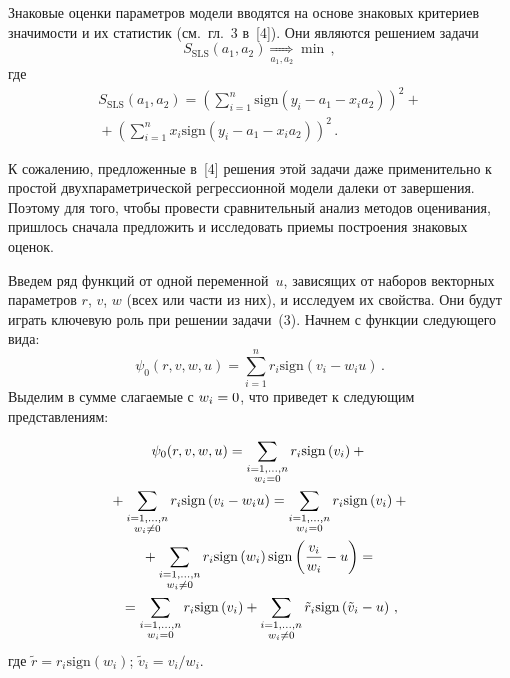 \begin{multicols}{2}
     Знаковые оценки параметров модели вводятся на основе знаковых
критериев значимости и их статистик (см.\ гл.~3 в~[4]). Они являются решением
задачи
     \begin{equation}
     S_{\mathrm{SLS}}(a_1,a_2) \underset{a_1,a_2}{\Longrightarrow} \min\,,
     \label{e3-kri}
     \end{equation}
где
\begin{multline*}
S_{\mathrm{SLS}}(a_1,a_2) = \left( \sum\limits_{i=1}^n \mathrm{sign} \left( y_i -a_1 -x_i a_2
\right)\right)^2 +{}\\
{}+\left( \sum\limits_{i=1}^n x_i \mathrm{sign} \left( y_i -a_1 -x_i a_2\right)
\right)^2\,.
\end{multline*}

     К сожалению, предложенные в~[4] решения этой задачи даже
применительно к простой двух\-па\-ра\-мет\-ри\-че\-ской регрессионной модели далеки
от завершения. Поэтому для того, чтобы провести сравнительный анализ
методов оценивания, пришлось сначала предложить и исследовать приемы
построения знаковых оценок.

     Введем ряд функций от одной переменной~$u$, зависящих от наборов
векторных параметров $r$, $v$, $w$ (всех или части из них), и исследуем их
свойства. Они будут играть ключевую роль при решении задачи~(3). Начнем с
функции следующего вида:
     $$
     \psi_0 (r,v,w,u) =\sum\limits_{i=1}^n r_i \mathrm{sign} \left( v_i-w_iu\right)\,.
     $$
Выделим в сумме слагаемые с $w_i\hm=0$, что приведет к следующим
представлениям:

\noindent
\begin{multline*}
\psi_0(r,v,w,u) =\sum\limits_{\substack{{i=1,\ldots , n}\\
{w_i=0}}} r_i \mathrm{sign}\left (v_i\right) +{}\\
{}+
\sum\limits_{{\substack{{i=1,\ldots ,n}\\{w_i\not=0}}}} r_i
\mathrm{sign}\left (v_i-w_i u\right)= %
\sum\limits_{\substack{{i=1,\ldots , n}\\
{w_i=0}}} r_i \mathrm{sign}\left(v_i\right) +{}\\
{}+
\sum\limits_{\substack{{i=1,\ldots ,n}\\{w_i\not=0}}} r_i \mathrm{sign}\left (w_i\right)
\mathrm{sign} \left(
\fr{v_i}{w_i}-u\right)={}\\
{}=
\sum\limits_{\substack{{i=1,\ldots , n}\\
{w_i=0}}} r_i \mathrm{sign}\left (v_i\right) +
\sum\limits_{\substack{{i=1,\ldots ,n}\\{w_i\not=0}}} \tilde{r}_i
\mathrm{sign}\left (\tilde{v}_i- u\right)\,,
\end{multline*}
где $\tilde{r} =r_i \mathrm{sign}\left(w_i\right)$; $\tilde{v}_i = v_i/w_i$.


\end{multicols}

